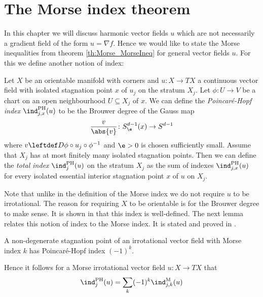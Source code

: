 
\section{The Morse index theorem}

In this chapter we will discuss harmonic vector fields $u$ which are not necessarily a
gradient field of the form $u=\nabla f$. Hence we would like to state the Morse inequalities from theorem \ref{th:Morse_MorseIneq}
for general vector fields $u$.
For this we define another notion of index:
\begin{definition}
  \label{df:poincareHopf_index}
  Let $X$ be an orientable manifold with corners and $u\colon X\to TX$ a continuous vector field
  with isolated stagnation point $x$ of $u_j$ on the stratum $X_j$.
  Let $\phi\colon U\to V$ be a chart on an open neighbourhood $U\subseteq X_j$ of $x$.
  We can define the
  \emph{Poincaré-Hopf index} $\ind^{\text{PH}}_{j,x}(u)$ to be the Brouwer degree of the Gauss map
  \begin{align*}
    \frac{v}{\abs{v}}\colon S^{d-1}_\e(x)\to S^{d-1}
  \end{align*}
  where $v\leftdef D\phi\circ u_j\circ \phi^{-1}$ and $\e>0$ is chosen sufficiently small.
  Assume that $X_j$ has at most finitely many isolated stagnation points.
  Then we can define the
   \emph{total index} $\ind^{\text{PH}}_{j}(u)$ on the stratum $X_j$ as the sum of indexes $\ind^{\text{PH}}_{j,x}(u)$
  for every isolated essential interior stagnation point $x$ of $u$ on $X_j$.
\end{definition}
Note that unlike in the definition of the Morse index we do not require $u$ to be irrotational.
The reason for requiring $X$ to be orientable is for the Brouwer degree to make sense.
It is shown in \cite[§6, Lemma 1]{Milnor1965} that this index is well-defined.
The next lemma relates this notion of index to the Morse index.
It is stated and proved in \cite[§6, Lemma 4]{Milnor1965}.
\begin{lemma}
  A non-degenerate stagnation point of an irrotational vector field
  with Morse index $k$ has Poincaré-Hopf index $(-1)^k$.
\end{lemma}
Hence it follows for a Morse irrotational vector field $u\colon X\to TX$ that
\begin{align*}
  \ind^{\text{PH}}_j(u)=\sum_k(-1)^k\ind^\text{M}_{j,k}(u)
\end{align*}
